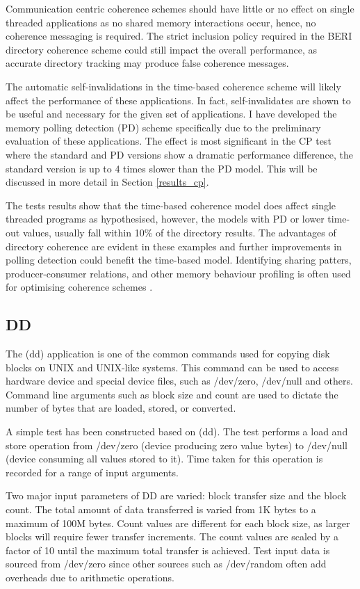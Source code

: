 	Communication centric coherence schemes should have little or no effect on single threaded applications as no shared memory interactions occur, hence, no coherence messaging is required. The strict inclusion policy required in the BERI directory coherence scheme could still impact the overall performance, as accurate directory tracking may produce false coherence messages.
	
	The automatic self-invalidations in the time-based coherence scheme will likely affect the performance of these applications. In fact, self-invalidates are shown to be useful and necessary for the given set of applications. I have developed the memory polling detection (PD) scheme specifically due to the preliminary evaluation of these applications. The effect is most significant in the CP test where the standard and PD versions show a dramatic performance difference, the standard version is up to 4 times slower than the PD model. This will be discussed in more detail in Section \ref{results_cp}.
	
	The tests results show that the time-based coherence model does affect single threaded programs as hypothesised, however, the models with PD or lower time-out values, usually fall within 10\% of the directory results. The advantages of directory coherence are evident in these examples and further improvements in polling detection could benefit the time-based model. Identifying sharing patters, producer-consumer relations, and other memory behaviour profiling is often used for optimising coherence schemes \cite{Byrd99,Lilja93,Sanchez12,Cuesta11}.

	\subsection{DD}
		\label{results_dd}
		The (dd) application is one of the common commands used for copying disk blocks on UNIX and UNIX-like systems. This command can be used to access hardware device and special device files, such as /dev/zero, /dev/null and others. Command line arguments such as block size and count are used to dictate the number of bytes that are loaded, stored, or converted.
		
		A simple test has been constructed based on (dd). The test performs a load and store operation from /dev/zero (device producing zero value bytes) to /dev/null (device consuming all values stored to it). Time taken for this operation is recorded for a range of input arguments. 
		
		Two major input parameters of DD are varied: block transfer size and the block count. The total amount of data transferred is varied from 1K bytes to a maximum of 100M bytes. Count values are different for each block size, as larger blocks will require fewer transfer increments. The count values are scaled by a factor of 10 until the maximum total transfer is achieved. 
		Test input data is sourced from /dev/zero since other sources such as /dev/random often add overheads due to arithmetic operations.
		
